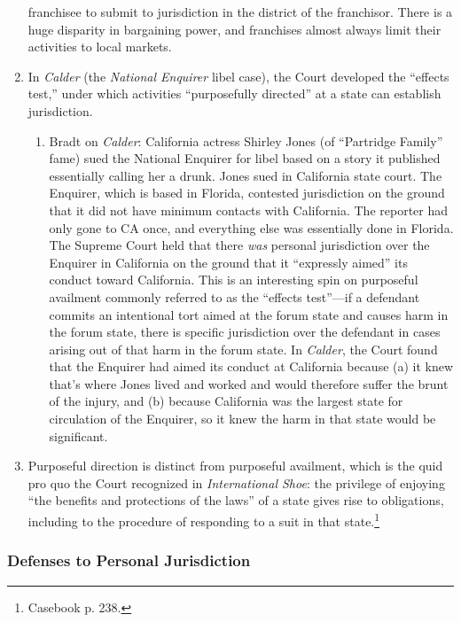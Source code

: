 \begin{enumerate}
    franchisee to submit to jurisdiction in the district of the franchisor.  
    There is a huge disparity in bargaining power, and franchises almost 
    always limit their activities to local markets.
    \item In \emph{Calder} (the \emph{National Enquirer} libel case), the 
    Court developed the ``effects test,'' under which activities 
    ``purposefully directed'' at a state can establish jurisdiction.
    \begin{enumerate}
        \item Bradt on \emph{Calder}: California actress Shirley Jones (of 
        ``Partridge Family'' fame) sued the National Enquirer for libel based 
        on a story it published essentially calling her a drunk. Jones sued in 
        California state court. The Enquirer, which is based in Florida, 
        contested jurisdiction on the ground that it did not have minimum 
        contacts with California. The reporter had only gone to CA once, and 
        everything else was essentially done in Florida. The Supreme Court 
        held that there \emph{was} personal jurisdiction over the Enquirer in 
        California on the ground that it ``expressly aimed'' its conduct 
        toward California. This is an interesting spin on purposeful availment 
        commonly referred to as the ``effects test''---if a defendant commits 
        an intentional tort aimed at the forum state and causes harm in the 
        forum state, there is specific jurisdiction over the defendant in 
        cases arising out of that harm in the forum state. In \emph{Calder}, 
        the Court found that the Enquirer had aimed its conduct at California 
        because (a) it knew that's where Jones lived and worked and would 
        therefore suffer the brunt of the injury, and (b) because California 
        was the largest state for circulation of the Enquirer, so it knew the 
        harm in that state would be significant.  \end{enumerate}
    \item Purposeful direction is distinct from purposeful availment, which is 
    the quid pro quo the Court recognized in \emph{International Shoe}: the 
    privilege of enjoying ``the benefits and protections of the laws'' of a 
    state gives rise to obligations, including to the procedure of responding 
    to a suit in that state.\footnote{Casebook p. 238.}
\end{enumerate}

\subsubsection{Defenses to Personal Jurisdiction}

